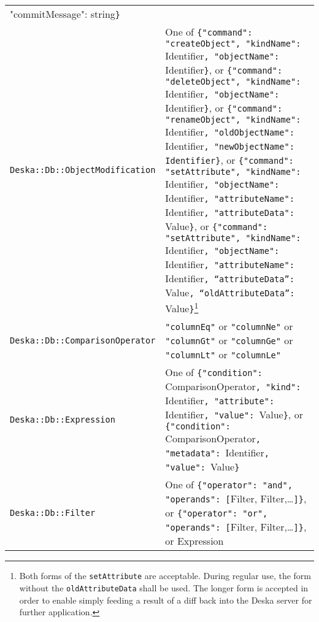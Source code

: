 \documentclass{article}
\begin{document}
\begin{longtable}{ p{60mm} p{90mm} }
{        "commitMessage": }string{\tt\}}
        \\
    {\tt Deska::Db::ObjectModification} &
        One of \newline
        {\tt \{"command": "createObject", "kindName": }Identifier{\tt, "objectName": }Identifier{\tt \}}, \newline
        or \newline
        {\tt \{"command": "deleteObject", "kindName": }Identifier{\tt, "objectName": }Identifier{\tt \}}, \newline
        or \newline
        {\tt \{"command": "renameObject", "kindName": }Identifier{\tt, "oldObjectName": }Identifier{\tt,
        "newObjectName": }{\tt Identifier\}}, \newline
        or \newline
        {\tt \{"command": "setAttribute", "kindName": }Identifier{\tt, "objectName": }Identifier{\tt, "attributeName":
        }Identifier{\tt, "attributeData": }Value{\tt \}}, \newline
        or \newline
        {\tt \{"command": "setAttribute", "kindName": }Identifier{\tt, "objectName": }Identifier{\tt, "attributeName":
        }Identifier{\tt, ``attributeData'': }Value{\tt, ``oldAttributeData'': }Value{\tt \}}\footnote{Both forms of the
        {\tt setAttribute} are acceptable.  During regular use, the form without the {\tt oldAttributeData} shall be
        used.  The longer form is accepted in order to enable simply feeding a result of a diff back into the Deska
        server for further application.} \\
    {\tt Deska::Db::ComparisonOperator} &
        {\tt "columnEq"} or {\tt "columnNe"} or {\tt "columnGt"} or {\tt "columnGe"} or {\tt "columnLt"} or
        {\tt "columnLe"}
        \\
    {\tt Deska::Db::Expression} &
        One of \newline
        {\tt \{"condition": }ComparisonOperator{\tt, "kind": }Identifier{\tt, "attribute": }Identifier{\tt, "value":
        }Value{\tt \}}, \newline
        or \newline
        {\tt \{"condition": }ComparisonOperator{\tt, "metadata": }Identifier{\tt, "value": }Value{\tt \}}
        \\
    {\tt Deska::Db::Filter} &
        One of \newline
        {\tt \{"operator": "and", "operands": [}Filter, Filter,\ldots{\tt]\}}, \newline
        or \newline
        {\tt \{"operator": "or", "operands": [}Filter, Filter,\ldots{\tt]\}}, \newline
        or \newline
        Expression

\end{longtable}
\end{document}
